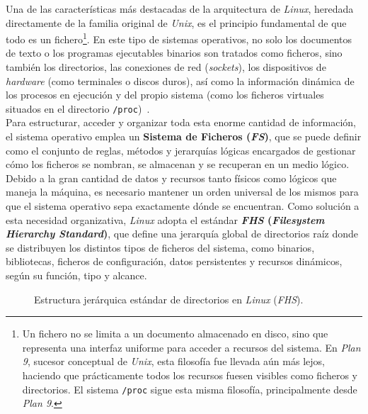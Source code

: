 Una de las características más destacadas de la arquitectura de \textit{Linux}, heredada directamente de la familia original de \textit{Unix}, es el principio fundamental de que \guillemotleft todo es un fichero\guillemotright\footnote{Un fichero no se limita a un documento almacenado en disco, sino que representa una interfaz uniforme para acceder a recursos del sistema. En \textit{Plan 9}, sucesor conceptual de \textit{Unix}, esta filosofía fue llevada aún más lejos, haciendo que prácticamente todos los recursos fuesen visibles como ficheros y directorios. El sistema \texttt{/proc} sigue esta misma filosofía, principalmente desde \textit{Plan 9}.}.
En este tipo de sistemas operativos, no solo los documentos de texto o los programas ejecutables binarios son tratados como ficheros, sino también los directorios, las conexiones de red (\textit{sockets}), los dispositivos de \textit{hardware} (como terminales o discos duros),
así como la información dinámica de los procesos en ejecución y del propio sistema (como los ficheros virtuales situados en el directorio \texttt{/proc})~\cite{love_linux}.\\

Para estructurar, acceder y organizar toda esta enorme cantidad de información, el sistema operativo emplea un \textbf{Sistema de Ficheros (\textit{FS})}, que se puede definir como el conjunto de reglas, métodos y jerarquías lógicas encargados de gestionar cómo los ficheros se nombran, se almacenan y se recuperan en un medio lógico.\\

Debido a la gran cantidad de datos y recursos tanto físicos como lógicos que maneja la máquina, es necesario mantener un orden universal de los mismos para que el sistema operativo sepa exactamente dónde se encuentran.
Como solución a esta necesidad organizativa, \textit{Linux} adopta el estándar \textbf{\textit{FHS} (\textit{Filesystem Hierarchy Standard})}, que define una jerarquía global de directorios raíz donde se distribuyen los distintos tipos de ficheros del sistema, como binarios, bibliotecas, ficheros de configuración, datos persistentes y recursos dinámicos, según su función, tipo y alcance.\\

\begin{figure}[H]
  \centering
  \scalebox{0.8}{}
  \caption{Estructura jerárquica estándar de directorios en \textit{Linux} (\textit{FHS}).}
  \label{fig:fhs}
\end{figure}

